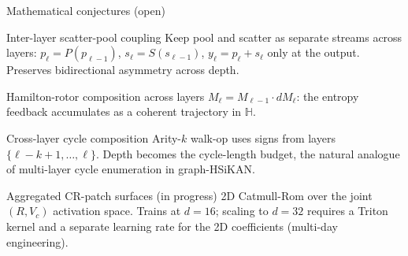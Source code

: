 \documentclass[aspectratio=169, 11pt]{beamer}
\begin{document}
\begin{frame}{Mathematical conjectures (open)}
  \footnotesize
  \begin{block}{Inter-layer scatter-pool coupling}
  Keep pool and scatter as separate streams across layers:
  $p_\ell = P(p_{\ell-1})$, $s_\ell = S(s_{\ell-1})$,
  $y_\ell = p_\ell + s_\ell$ only at the output. Preserves
  bidirectional asymmetry across depth.
  \end{block}

  \begin{block}{Hamilton-rotor composition across layers}
  $M_\ell = M_{\ell-1} \cdot dM_\ell$: the entropy feedback
  accumulates as a coherent trajectory in $\mathbb{H}$.
  \end{block}

  \begin{block}{Cross-layer cycle composition}
  Arity-$k$ walk-op uses signs from layers
  $\{\ell-k+1, \dots, \ell\}$. Depth becomes the cycle-length budget,
  the natural analogue of multi-layer cycle enumeration in
  graph-HSiKAN.
  \end{block}

  \begin{block}{Aggregated CR-patch surfaces (in progress)}
  2D Catmull-Rom over the joint $(R, V_c)$ activation space.
  Trains at $d=16$; scaling to $d=32$ requires a Triton kernel and a
  separate learning rate for the 2D coefficients (multi-day engineering).
  \end{block}
\end{frame}
\end{document}
